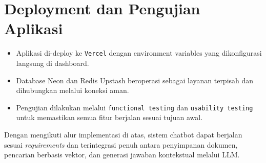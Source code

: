 \section{Deployment dan Pengujian Aplikasi}

\begin{itemize}
  \item Aplikasi di-deploy ke \texttt{Vercel} dengan environment variables yang dikonfigurasi langsung di dashboard.
  \item Database Neon dan Redis Upstash beroperasi sebagai layanan terpisah dan dihubungkan melalui koneksi aman.
  \item Pengujian dilakukan melalui \texttt{functional testing} dan \texttt{usability testing} untuk memastikan semua fitur berjalan sesuai tujuan awal.
\end{itemize}

\noindent
Dengan mengikuti alur implementasi di atas, sistem chatbot dapat berjalan sesuai \emph{requirements} dan terintegrasi penuh antara penyimpanan dokumen, pencarian berbasis vektor, dan generasi jawaban kontekstual melalui LLM.
